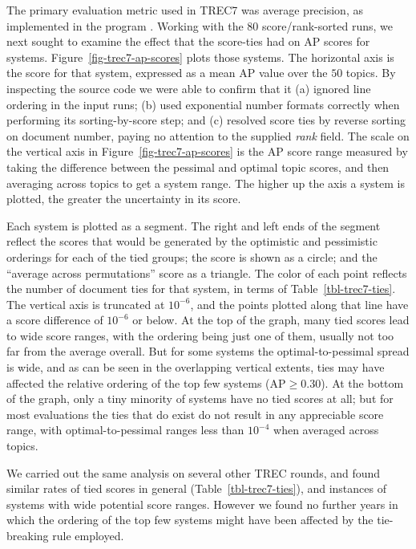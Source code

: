 The primary evaluation metric used in TREC7 was average precision, as
implemented in the program {\treceval}.
Working with the $80$ score/rank-sorted runs, we next sought to
examine the effect that the score-ties had on AP scores for systems.
Figure~\ref{fig-trec7-ap-scores} plots those systems.
The horizontal axis is the {\treceval} score for that system,
expressed as a mean AP value over the $50$ topics.
By inspecting the {\treceval} source code we were able to confirm
that it (a) ignored line ordering in the input runs; (b) used
exponential number formats correctly when performing its
sorting-by-score step; and (c) resolved score ties by reverse sorting
on document number, paying no attention to the supplied {\emph{rank}}
field.
The scale on the vertical axis in Figure~\ref{fig-trec7-ap-scores} is
the AP score range measured by taking the difference between the
pessimal and optimal topic scores, and then averaging across topics
to get a system range.
The higher up the axis a system is plotted, the greater the
uncertainty in its score.

Each system is plotted as a segment.
The right and left ends of the segment reflect the scores that would
be generated by the optimistic and pessimistic orderings for each of
the tied groups; the {\treceval} score is shown as a circle; and the
``average across permutations'' score as a triangle.
The color of each point reflects the number of document ties for that
system, in terms of Table~\ref{tbl-trec7-ties}.
The vertical axis is truncated at $10^{-6}$, and the points plotted
along that line have a score difference of $10^{-6}$ or below.
At the top of the graph, many tied scores lead to wide score ranges,
with the {\treceval} ordering being just one of them, usually not too
far from the average overall.
But for some systems the optimal-to-pessimal spread is wide, and as
can be seen in the overlapping vertical extents, ties may have
affected the relative ordering of the top few systems ($\mbox{AP}\ge
0.30$).
At the bottom of the graph, only a tiny minority of systems have no
tied scores at all; but for most evaluations the ties that do exist
do not result in any appreciable score range, with
optimal-to-pessimal ranges less than $10^{-4}$ when averaged across
topics.



We carried out the same analysis on several other TREC rounds, and
found similar rates of tied scores in general
(Table~\ref{tbl-trec7-ties}), and instances of systems with wide
potential score ranges.
However we found no further years in which the ordering of the
top few systems might have been affected by the tie-breaking rule
employed.


